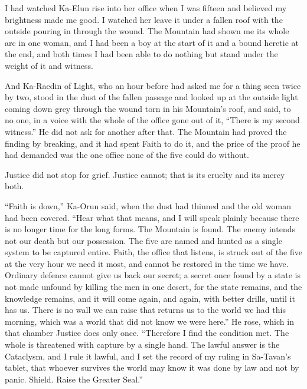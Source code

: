 I had watched Ka-Elun rise into her office when I was fifteen and believed my brightness made me good. I watched her leave it under a fallen roof with the outside pouring in through the wound. The Mountain had shown me its whole arc in one woman, and I had been a boy at the start of it and a bound heretic at the end, and both times I had been able to do nothing but stand under the weight of it and witness.\par

And Ka-Raedin of Light, who an hour before had asked me for a thing seen twice by two, stood in the dust of the fallen passage and looked up at the outside light coming down grey through the wound torn in his Mountain's roof, and said, to no one, in a voice with the whole of the office gone out of it, ``There is my second witness.'' He did not ask for another after that. The Mountain had proved the finding by breaking, and it had spent Faith to do it, and the price of the proof he had demanded was the one office none of the five could do without.\par

\ornament

Justice did not stop for grief. Justice cannot; that is its cruelty and its mercy both.\par

``Faith is down,'' Ka-Orun said, when the dust had thinned and the old woman had been covered. ``Hear what that means, and I will speak plainly because there is no longer time for the long forms. The Mountain is found. The enemy intends not our death but our possession. The five are named and hunted as a single system to be captured entire. Faith, the office that listens, is struck out of the five at the very hour we need it most, and cannot be restored in the time we have. Ordinary defence cannot give us back our secret; a secret once found by a state is not made unfound by killing the men in one desert, for the state remains, and the knowledge remains, and it will come again, and again, with better drills, until it has us. There is no wall we can raise that returns us to the world we had this morning, which was a world that did not know we were here.'' He rose, which in that chamber Justice does only once. ``Therefore I find the condition met. The whole is threatened with capture by a single hand. The lawful answer is the Cataclysm, and I rule it lawful, and I set the record of my ruling in Sa-Tavan's tablet, that whoever survives the world may know it was done by law and not by panic. Shield. Raise the Greater Seal.''\par

